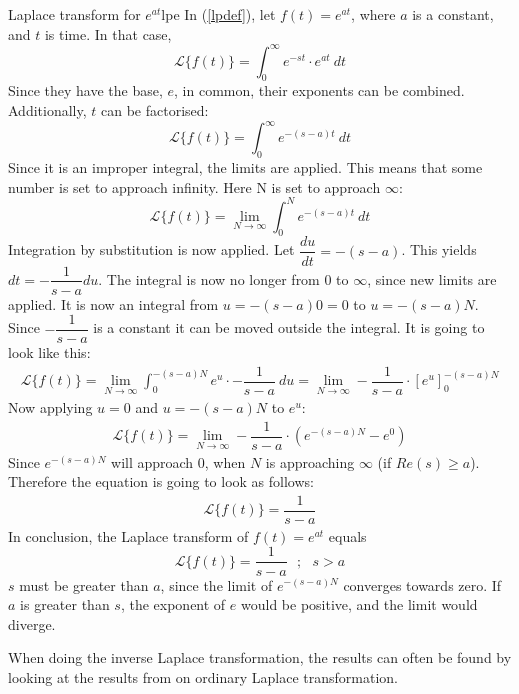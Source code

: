 \begin{example}{Laplace transform for $e^{at}$}{lpe}
In (\ref{lpdef}), let $f(t)=e^{at}$, where $a$ is a constant, and $t$ is time. In that case,
$$\mathcal{L}\{f(t)\}=\int_{0}^{\infty} e^{-st}\cdot e^{at}\ dt$$
Since they have the base, $e$, in common, their exponents can be combined. Additionally, $t$ can be factorised:
$$\mathcal{L}\{f(t)\}=\int_{0}^{\infty} e^{-(s-a)t}\ dt$$
Since it is an improper integral, the limits are applied. This means that some number is set to approach infinity. Here N is set to approach $\infty$:
$$\mathcal{L}\{f(t)\}=\lim_{N \to \infty} \int_{0}^{N} e^{-(s-a)t}\ dt$$
Integration by substitution is now applied. Let $\dfrac{du}{dt}=-(s-a)$. This yields $dt=-\dfrac{1}{s-a}du$. The integral is now no longer from 0 to $\infty$, since new limits are applied. It is now an integral from $u=-(s-a)0=0$ to $u=-(s-a)N$. Since $-\dfrac{1}{s-a}$ is a constant it can be moved outside the integral. It is going to look like this:
\begin{align}
\mathcal{L}\{f(t)\}=\lim_{N \to \infty} \int_{0}^{-(s-a)N} e^{u}\cdot -\dfrac{1}{s-a}\ du = \lim_{N \to \infty} -\dfrac{1}{s-a} \cdot \left[e^{u} \right]_{0}^{-(s-a)N}
\label{eq6.2}
\end{align}
Now applying $u=0$ and $u=-(s-a)N$ to $e^{u}$:
\begin{align*}
\mathcal{L}\{f(t)\} =\lim_{N \to \infty} -\dfrac{1}{s-a}\cdot (e^{-(s-a)N}-e^{0})
\end{align*}
Since $e^{-(s-a)N}$ will approach $0$, when $N$ is approaching $\infty$ (if $Re(s) \geq a$). Therefore the equation is going to look as follows:
\begin{align}
\mathcal{L}\{f(t)\} = \dfrac{1}{s-a}
\end{align}
In conclusion, the Laplace transform of $f(t)=e^{at}$ equals
$$\mathcal{L}\{f(t)\}=\dfrac{1}{s-a} \ \ \ ;\ \ \ s>a$$
$s$ must be greater than $a$, since the limit of $e^{-(s-a)N}$ converges towards zero. If $a$ is greater than $s$, the exponent of $e$ would be positive, and the limit would diverge.
\end{example}
When doing the inverse Laplace transformation, the results can often be found by looking at the results from on ordinary Laplace transformation.
